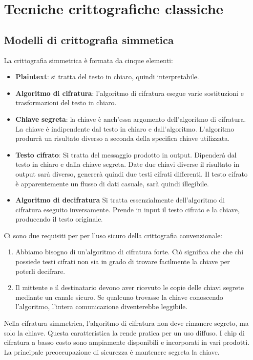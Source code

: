 \chapter{Tecniche crittografiche classiche}
\section{Modelli di crittografia simmetica}
La crittografia simmetrica è formata da cinque elementi:
\begin{itemize}
    \item \textbf{Plaintext}: si tratta del testo in chiaro, quindi interpretabile.
    \item \textbf{Algoritmo di cifratura}: l'algoritmo di cifratura esegue 
    varie sostituzioni e trasformazioni del testo in chiaro.
    \item \textbf{Chiave segreta}: la chiave è anch'essa argomento dell'algoritmo 
    di cifratura. La chiave è indipendente dal testo in chiaro e dall'algoritmo. 
    L'algoritmo produrrà un risultato diverso a seconda della specifica chiave utilizzata.
    \item \textbf{Testo cifrato}: Si tratta del messaggio prodotto in output. Dipenderà 
    dal testo in chiaro e dalla chiave segreta. Date due chiavi diverse il risultato 
    in output sarà diverso, genererà quindi due testi cifrati differenti. Il testo 
    cifrato è apparentemente un flusso di dati casuale, sarà quindi illegibile.
    \item \textbf{Algoritmo di decifratura} Si tratta essenzialmente dell'algoritmo 
    di cifratura eseguito inversamente. Prende in input il testo cifrato e la chiave, producendo 
    il testo originale.
\end{itemize}
Ci sono due requisiti per per l'uso sicuro della crittografia convenzionale:
\begin{enumerate}
    \item Abbiamo bisogno di un'algoritmo di cifratura forte. Ciò significa che 
    che chi possiede testi cifrati non sia in grado di trovare facilmente la chiave per
    poterli decifrare.
    \item Il mittente e il destinatario devono aver ricevuto le copie delle chiavi 
    segrete mediante un canale sicuro. Se qualcuno trovasse la chiave conoscendo 
    l'algoritmo, l'intera comunicazione diventerebbe leggibile.
\end{enumerate}
Nella cifratura simmetrica, l'algoritmo di cifratura non deve rimanere segreto, 
ma solo la chiave. Questa caratteristica la rende pratica per un uso diffuso.
I chip di cifratura a basso costo sono ampiamente disponibili e incorporati
in vari prodotti. La principale preoccupazione di sicurezza è mantenere
segreta la chiave.
